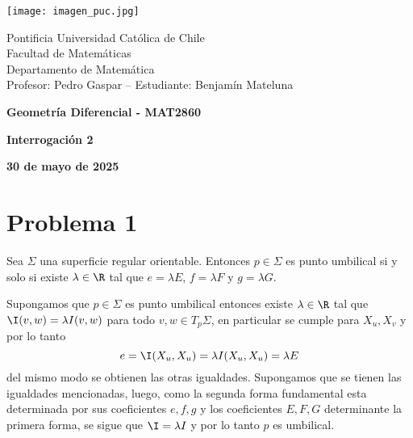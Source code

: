 \documentclass{article}
\begin{document}
\begin{minipage}{2.5cm}
    \texttt{[image: imagen\_puc.jpg]}
\end{minipage}
\begin{minipage}{14cm}
    {\sc Pontificia Universidad Católica de Chile\\
    Facultad de Matemáticas\\
    Departamento de Matemática\\
    Profesor: Pedro Gaspar -- Estudiante: Benjamín Mateluna}
\end{minipage}
\vspace{1ex}

{\centerline{\bf Geometría Diferencial - MAT2860}
\centerline{\bf Interrogación 2}}
\centerline{\bf 30 de mayo de 2025}

\section*{Problema 1}
\begin{lema}
    Sea $\Sigma$ una superficie regular orientable. Entonces $p\in\Sigma$ es punto umbilical si y
    solo si existe $\lambda\in\R$ tal que $e=\lambda E$, $f=\lambda F$ y $g=\lambda G$.
\end{lema}
\begin{dem}
    Supongamos que $p\in\Sigma$ es punto umbilical entonces existe $\lambda\in\R$ tal que 
    $\I(v,w)=\lambda I(v,w)$ para todo $v,w\in T_{p}\Sigma$, en particular se cumple para 
    $X_{u},X_{v}$ y por lo tanto
    \begin{equation*}
        e=\I(X_{u},X_{u})=\lambda I(X_{u},X_{u})=\lambda E
    \end{equation*}
    del mismo modo se obtienen las otras igualdades. Supongamos que se tienen las igualdades 
    mencionadas, luego, como la segunda forma fundamental esta determinada por sus coeficientes 
    $e,f,g$ y los coeficientes $E,F,G$ determinante la primera forma, se sigue que $\I=\lambda I$ 
    y por lo tanto $p$ es umbilical.
\end{dem}
\end{document}
